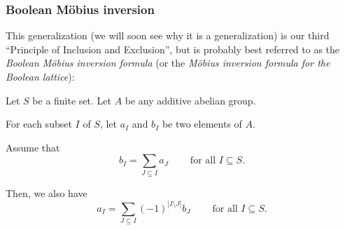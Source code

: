 \subsubsection{\label{subsec.sign.pie.moeb-bool}Boolean M\"{o}bius inversion}

This generalization (we will soon see why it is a generalization) is our third
\textquotedblleft Principle of Inclusion and Exclusion\textquotedblright, but
is probably best referred to as the \emph{Boolean M\"{o}bius inversion
formula} (or the \emph{M\"{o}bius inversion formula for the Boolean lattice}):

\begin{theorem}
\label{thm.pie.moeb}Let $S$ be a finite set. Let
$A$ be any additive abelian group.

For each subset $I$ of $S$, let $a_{I}$ and $b_{I}$ be two elements of $A$.

Assume that%
\begin{equation}
b_{I}=\sum_{J\subseteq I}a_{J}\ \ \ \ \ \ \ \ \ \ \text{for all }I\subseteq S.
\label{eq.thm.pie.moeb.ass}%
\end{equation}


Then, we also have%
\begin{equation}
a_{I}=\sum_{J\subseteq I}\left(  -1\right)  ^{\left\vert I\setminus
J\right\vert }b_{J}\ \ \ \ \ \ \ \ \ \ \text{for all }I\subseteq S.
\label{eq.thm.pie.moeb.claim}%
\end{equation}

\end{theorem}

